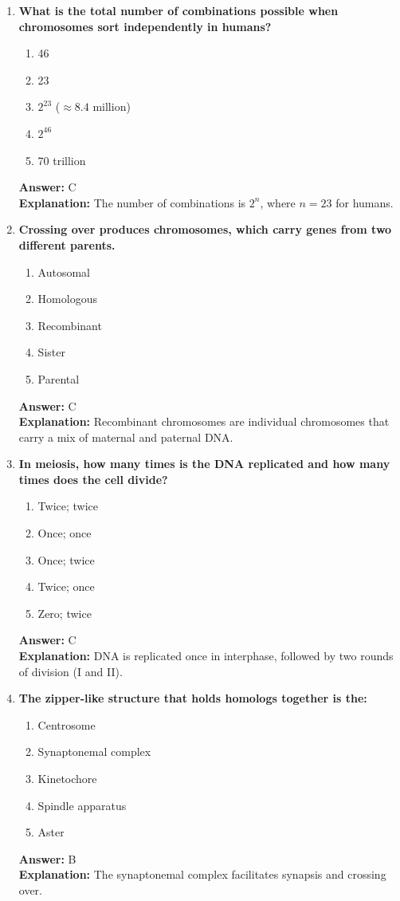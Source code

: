 \documentclass[11pt, a4paper]{article}
\begin{document}
\begin{enumerate}[leftmargin=*, label=\arabic*.]
\item \textbf{What is the total number of combinations possible when chromosomes sort independently in humans?}
\begin{enumerate}[label=\Alph*.]
\item 46
\item 23
\item $2^{23}$ ($\approx 8.4$ million)
\item $2^{46}$
\item 70 trillion
\end{enumerate}
\textbf{Answer:} C \\
\textbf{Explanation:} The number of combinations is $2^n$, where $n=23$ for humans.

\item \textbf{Crossing over produces \underline{\hspace{1cm}} chromosomes, which carry genes from two different parents.}
\begin{enumerate}[label=\Alph*.]
\item Autosomal
\item Homologous
\item Recombinant
\item Sister
\item Parental
\end{enumerate}
\textbf{Answer:} C \\
\textbf{Explanation:} Recombinant chromosomes are individual chromosomes that carry a mix of maternal and paternal DNA.

\item \textbf{In meiosis, how many times is the DNA replicated and how many times does the cell divide?}
\begin{enumerate}[label=\Alph*.]
\item Twice; twice
\item Once; once
\item Once; twice
\item Twice; once
\item Zero; twice
\end{enumerate}
\textbf{Answer:} C \\
\textbf{Explanation:} DNA is replicated once in interphase, followed by two rounds of division (I and II).

\item \textbf{The zipper-like structure that holds homologs together is the:}
\begin{enumerate}[label=\Alph*.]
\item Centrosome
\item Synaptonemal complex
\item Kinetochore
\item Spindle apparatus
\item Aster
\end{enumerate}
\textbf{Answer:} B \\
\textbf{Explanation:} The synaptonemal complex facilitates synapsis and crossing over.


\end{enumerate}
\end{document}
